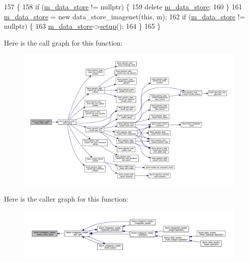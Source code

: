 \begin{DoxyCode}
157                                                \{
158   \textcolor{keywordflow}{if} (\hyperlink{classlbann_1_1generic__data__reader_aefc076b842933a882214f4f709ca49c9}{m\_data\_store} != \textcolor{keyword}{nullptr}) \{
159     \textcolor{keyword}{delete} \hyperlink{classlbann_1_1generic__data__reader_aefc076b842933a882214f4f709ca49c9}{m\_data\_store};
160   \}
161   \hyperlink{classlbann_1_1generic__data__reader_aefc076b842933a882214f4f709ca49c9}{m\_data\_store} = \textcolor{keyword}{new} data\_store\_imagenet(\textcolor{keyword}{this}, m);
162   \textcolor{keywordflow}{if} (\hyperlink{classlbann_1_1generic__data__reader_aefc076b842933a882214f4f709ca49c9}{m\_data\_store} != \textcolor{keyword}{nullptr}) \{
163     \hyperlink{classlbann_1_1generic__data__reader_aefc076b842933a882214f4f709ca49c9}{m\_data\_store}->\hyperlink{classlbann_1_1generic__data__store_a1cff17def02ee21b6ca0befeb04bb582}{setup}();
164   \}
165 \}
\end{DoxyCode}
Here is the call graph for this function\+:\nopagebreak
\begin{figure}[H]
\begin{center}
\leavevmode
\includegraphics[width=350pt]{classlbann_1_1imagenet__reader_a17af38eff1c3aee001d263248b8406a1_cgraph}
\end{center}
\end{figure}
Here is the caller graph for this function\+:\nopagebreak
\begin{figure}[H]
\begin{center}
\leavevmode
\includegraphics[width=350pt]{classlbann_1_1imagenet__reader_a17af38eff1c3aee001d263248b8406a1_icgraph}
\end{center}
\end{figure}


